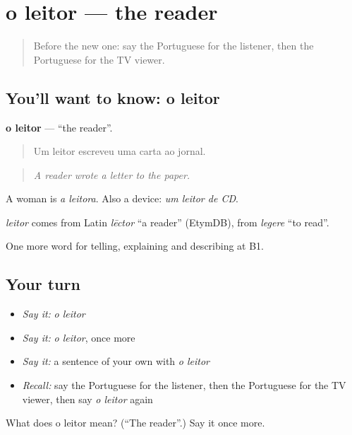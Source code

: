 \section[o leitor]{o leitor — the reader}

\label{lesson:PT-C285-leitor}



\begin{quote}
Before the new one: say the Portuguese for the listener, then the Portuguese for the TV viewer.
\end{quote}

\subsection*{You'll want to know: o leitor}
\textbf{o leitor} — \textquotedblleft{}the reader\textquotedblright{}.

\begin{quote}
Um leitor escreveu uma carta ao jornal.
\end{quote}

\begin{quote}
\emph{A reader wrote a letter to the paper.}
\end{quote}

A woman is \emph{a leitora}. Also a device: \emph{um leitor de CD}.

\begin{cousinweb}
\emph{leitor} comes from Latin \emph{lēctor} \textquotedblleft{}a reader\textquotedblright{} (EtymDB), from \emph{legere} \textquotedblleft{}to read\textquotedblright{}.
\end{cousinweb}

\begin{grammarlens}[title={What you've built}]
One more word for telling, explaining and describing at B1.
\end{grammarlens}

\subsection*{Your turn}
\begin{itemize}
\raggedright
  \item \emph{Say it:} \emph{o leitor}
  \item \emph{Say it:} \emph{o leitor}, once more
  \item \emph{Say it:} a sentence of your own with \emph{o leitor}
  \item \emph{Recall:} say the Portuguese for the listener, then the Portuguese for the TV viewer, then say \emph{o leitor} again
\end{itemize}

\begin{tcolorbox}[breakable,colback=teal!4,colframe=teal!35!black,title={Before you move on}]
What does o leitor mean? (\textquotedblleft{}The reader\textquotedblright{}.) Say it once more.
\end{tcolorbox}
